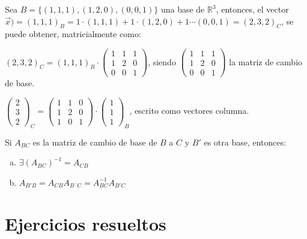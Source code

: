 \begin{ejem}
Sea $B=\{(1,1,1),(1,2,0),(0,0,1)\}$ una base de 	$\mathbb R^3$, entonces, el vector $\vec x)=(1,1,1)_B=1\cdot (1,1,1)+1\cdot (1,2,0)+ 1 \cdots(0,0,1)=(2,3,2)_C$, se puede obtener, matricialmente como:

$(2,3,2)_C= (1,1,1)_B \cdot \left( \begin{matrix} 1&1&1\\1&2&0\\0&0&1 \end{matrix} \right)$, siendo \scriptsize{$\left( \begin{matrix} 1&1&1\\1&2&0\\0&0&1 \end{matrix} \right)$} \normalsize{la} matriz de cambio de base.

\textcolor{gris}{$\left( \begin{matrix} 2\\3\\2 \end{matrix} \right)_C = 
\left( \begin{matrix} 1&1&0\\1&2&0\\1&0&1 \end{matrix} \right) \cdot 
\left( \begin{matrix} 1\\1\\1 \end{matrix} \right)_B$, escrito como vectores columna.}
\end{ejem}

\begin{teor}
Si $A_{BC}$ es la matriz de cambio de base de $B$ a $C$ y $B'$ es otra base, entonces:

\vspace{-4mm}
\begin{enumerate}[a) ]	
\item $\exists {(A_{BC})}^{-1}=A_{CB}$
\item $A_{B'B}=A_{CB}A_{B´C}=A^{-1}_{BC}A_{B'C}$	
\end{enumerate}

\end{teor}


\section{Ejercicios resueltos}

